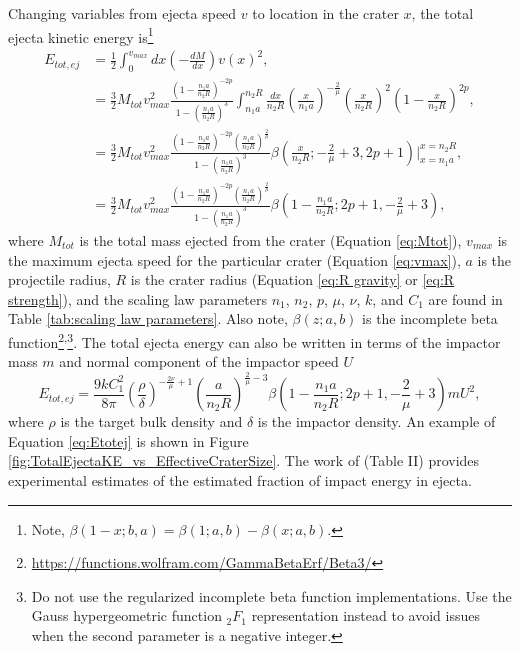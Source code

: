 \documentclass{article}
\begin{document}
Changing variables from ejecta speed $v$ to location in the crater $x$, the total ejecta kinetic energy is\footnote{Note, $\beta(1-x; b, a) = \beta(1; a, b) - \beta(x; a, b)$.}
\begin{align}
E_{tot,ej} &= \frac{1}{2}\int_{0}^{v_{max}}dx \left(-\frac{dM}{dx}\right)v(x)^2,\\\nonumber
&= \frac{3}{2}M_{tot}v_{max}^2\frac{\left(1-\frac{n_1 a}{n_2 R}\right)^{-2p}}{1-\left(\frac{n_1 a}{n_2 R}\right)^3}
\int_{n_1 a}^{n_2 R}
\frac{dx}{n_2 R}\left(\frac{x}{n_1 a}\right)^{-\frac{2}{\mu}}\left(\frac{x}{n_2 R}\right)^2\left(1-\frac{x}{n_2 R}\right)^{2p},\\\nonumber
& = \frac{3}{2}M_{tot}v_{max}^2\frac{\left(1-\frac{n_1 a}{n_2 R}\right)^{-2p}\left(\frac{n_1 a}{n_2 R}\right)^{\frac{2}{\mu}}}{1-\left(\frac{n_1 a}{n_2 R}\right)^3}
\beta\left(\frac{x}{n_2 R}; -\frac{2}{\mu}+3, 2p+1\right)\bigg\rvert^{x=n_2 R}_{x=n_1 a},\\
&=\frac{3}{2}M_{tot}v_{max}^2\frac{\left(1-\frac{n_1 a}{n_2 R}\right)^{-2p}\left(\frac{n_1 a}{n_2 R}\right)^{\frac{2}{\mu}}}{1-\left(\frac{n_1 a}{n_2 R}\right)^3}
\beta\left(1-\frac{n_1 a}{n_2 R}; 2p+1, -\frac{2}{\mu}+3\right),
\end{align}
where $M_{tot}$ is the total mass ejected from the crater (Equation \eqref{eq:Mtot}), $v_{max}$ is the maximum ejecta speed for the particular crater (Equation \eqref{eq:vmax}), $a$ is the projectile radius, $R$ is the crater radius (Equation \eqref{eq:R gravity} or \eqref{eq:R strength}), and the scaling law parameters $n_1$, $n_2$, $p$, $\mu$, $\nu$, $k$, and $C_1$ are found in Table \ref{tab:scaling law parameters}. Also note, $\beta(z; a, b)$ is the incomplete beta function\footnote{\href{https://functions.wolfram.com/GammaBetaErf/Beta3/}{https://functions.wolfram.com/GammaBetaErf/Beta3/}}\textsuperscript{,}\footnote{Do not use the regularized incomplete beta function implementations. Use the Gauss hypergeometric function $_2F_1$ representation instead to avoid issues when the second parameter is a negative integer.}.
The total ejecta energy can also be written in terms of the impactor mass $m$ and normal component of the impactor speed $U$ 
\begin{equation}\label{eq:Etotej}
E_{tot,ej} = \frac{9kC_1^2}{8\pi}\left(\frac{\rho}{\delta}\right)^{-\frac{2\nu}{\mu}+1}\left(\frac{a}{n_2 R}\right)^{\frac{2}{\mu}-3}
\beta\left(1-\frac{n_1 a}{n_2 R}; 2p+1, -\frac{2}{\mu}+3\right)
mU^2,
\end{equation}
where $\rho$ is the target bulk density and $\delta$ is the impactor density. An example of Equation \eqref{eq:Etotej} is shown in Figure \ref{fig:TotalEjectaKE_vs_EffectiveCraterSize}. The work of \cite{hartmann1985impact} (Table II) provides experimental estimates of the estimated fraction of impact energy in ejecta.
\end{document}
